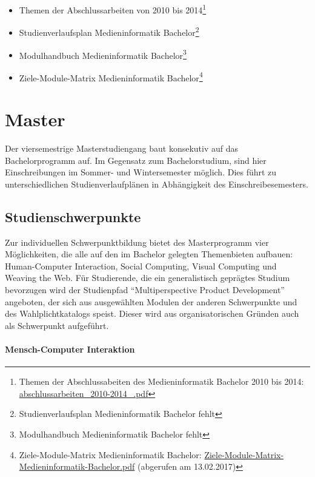\begin{itemize}
\tightlist
\item
  Themen der Abschlussarbeiten von 2010 bis 2014\footnote{Themen der
    Abschlussabeiten des Medieninformatik Bachelor 2010 bis 2014:
    \href{../anhaenge/abschlussarbeiten_2010-2014_.pdf}{abschlussarbeiten\_2010-2014\_.pdf}}
\item
  Studienverlaufsplan Medieninformatik Bachelor\footnote{Studienverlaufsplan
    Medieninformatik Bachelor fehlt}
\item
  Modulhandbuch Medieninformatik Bachelor\footnote{Modulhandbuch
    Medieninformatik Bachelor fehlt}
\item
  Ziele-Module-Matrix Medieninformatik Bachelor\footnote{Ziele-Module-Matrix
    Medieninformatik Bachelor:
    \href{../anhaenge/Ziele-Module-Matrix-Medieninformatik-Bachelor.pdf}{Ziele-Module-Matrix-Medieninformatik-Bachelor.pdf}
    (abgerufen am 13.02.2017)}
\end{itemize}

\section{Master}\label{master}

Der viersemestrige Masterstudiengang baut konsekutiv auf das
Bachelorprogramm auf. Im Gegensatz zum Bachelorstudium, sind hier
Einschreibungen im Sommer- und Wintersemester möglich. Dies führt zu
unterschiedlichen Studienverlaufplänen in Abhängigkeit des
Einschreibesemesters.

\subsection{Studienschwerpunkte}\label{studienschwerpunkte}

Zur individuellen Schwerpunktbildung bietet des Masterprogramm vier
Möglichkeiten, die alle auf den im Bachelor gelegten Themenbieten
aufbauen: Human-Computer Interaction, Social Computing, Visual Computing
und Weaving the Web. Für Studierende, die ein generalistisch geprägtes
Studium bevorzugen wird der Studienpfad ``Multiperspective Product
Development'' angeboten, der sich aus ausgewählten Modulen der anderen
Schwerpunkte und des Wahlplichtkatalogs speist. Dieser wird aus
organisatorischen Gründen auch als Schwerpunkt aufgeführt.

\paragraph{Mensch-Computer
Interaktion}\label{mensch-computer-interaktion}

